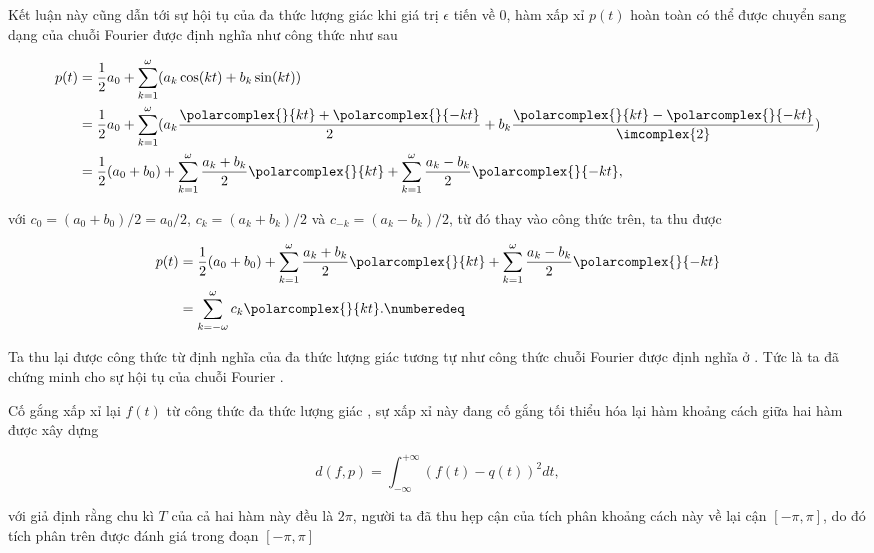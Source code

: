 		Kết luận này cũng dẫn tới sự hội tụ của đa thức lượng giác khi giá trị $\epsilon$ tiến về $0$, hàm xấp xỉ $p(t)$ hoàn toàn có thể được chuyển sang dạng của chuỗi Fourier được định nghĩa như công thức  như sau
		
			\begin{align*}
				p(t)	& = \frac{1}{2} a_0 + \sum_{k=1}^{\omega} (a_k \cos(kt) + b_k \sin(kt)) \\
						& = \frac{1}{2} a_0 + \sum_{k=1}^{\omega} (a_k \frac{\polarcomplex{}{kt} + \polarcomplex{}{-kt}}{2} + b_k \frac{\polarcomplex{}{kt} - \polarcomplex{}{-kt}}{\imcomplex{2}}) \\
						& = \frac{1}{2} (a_0 + b_0) + \sum_{k=1}^{\omega} \frac{a_k + b_k}{2} \polarcomplex{}{kt} + \sum_{k=1}^{\omega} \frac{a_k - b_k}{2} \polarcomplex{}{-kt},
			\end{align*}
		
		\noindent với $c_0 = (a_0 + b_0)/2 = a_0/2$, $c_k = (a_k + b_k)/2$ và $c_{-k} = (a_k - b_k)/2$, từ đó thay vào công thức trên, ta thu được
		
			\begin{align*}
				p(t)	& = \frac{1}{2} (a_0 + b_0) + \sum_{k=1}^{\omega} \frac{a_k + b_k}{2} \polarcomplex{}{kt} + \sum_{k=1}^{\omega} \frac{a_k - b_k}{2} \polarcomplex{}{-kt} \\
						& = \sum_{k=-\omega}^{\omega} c_k \polarcomplex{}{kt}. \numberedeq
				\label{fourier::infered_fourier_series}
			\end{align*}
		
		Ta thu lại được công thức  từ định nghĩa của đa thức lượng giác tương tự như công thức chuỗi Fourier được định nghĩa ở . Tức là ta đã chứng minh cho sự hội tụ của chuỗi Fourier \cite[\theorem{} 13.1]{approximate_trigonometric}.
		
		Cố gắng xấp xỉ lại $f(t)$ từ công thức đa thức lượng giác , sự xấp xỉ này đang cố gắng tối thiểu hóa lại hàm khoảng cách giữa hai hàm được xây dựng
		
			\begin{equation}
				d(f, p) = \int_{-\infty}^{+\infty} (f(t) - q(t))^2 dt,
				\label{fourier::distance_func}
			\end{equation}
		
		\noindent với giả định rằng chu kì $T$ của cả hai hàm này đều là $2\pi$, người ta \cite{approximate_trigonometric} đã thu hẹp cận của tích phân khoảng cách này về lại cận $[-\pi, \pi]$, do đó tích phân trên được đánh giá trong đoạn $[-\pi, \pi]$
		
